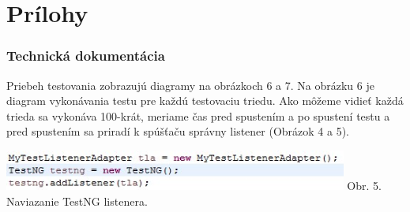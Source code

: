 \documentclass[11pt,twoside,slovak,a4paper]{article}
\begin{document}
    \newpage
 	\pagestyle{fancy}
 	\fancyhf{}
 	\fancyfoot[CE,CO]{\thepage}
 	
 	
 	
 	\newpage
 	\thispagestyle{plain}
 	\part*{Prílohy}
	\renewcommand\thesection{\Alph{section}}
	\setcounter{section}{0}
 	\section{Technická dokumentácia}
 	
 	Priebeh testovania zobrazujú diagramy na obrázkoch 6 a 7. Na obrázku 6 je diagram vykonávania testu pre každú testovaciu triedu. Ako môžeme vidieť každá trieda sa vykonáva 100-krát, meriame čas pred spustením a po spustení testu a pred spustením sa priradí k spúšťaču správny listener (Obrázok 4 a 5).
 	
 	
 	\begin{center}
 		\includegraphics[width = 320pt]{testng}
 		\newline
 		\tiny Obr. 5. Naviazanie TestNG listenera.
 	\end{center}
 	
\end{document}
